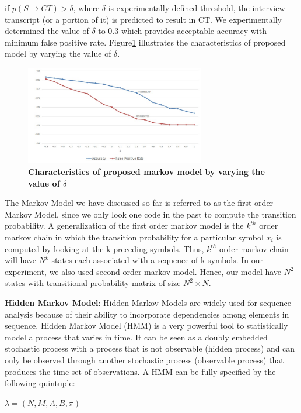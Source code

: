 \documentclass{amia}
\begin{document}
if $p(S\rightarrow CT) > \delta $, where $\delta$ is experimentally defined threshold, the interview transcript (or a portion of it) is predicted to result in CT. We experimentally determined the value of $\delta$ to 0.3 which provides acceptable accuracy with minimum false positive rate. Figure\ref{fig:delta} illustrates the characteristics of proposed model by varying the value of $\delta$. 

\begin{figure}[htb!]
    \centering
    \includegraphics[width=0.70\textwidth]{figures/deltadata.png}
    \caption{\textbf{Characteristics of proposed markov model by varying the value of $\delta$}}
    \label{fig:delta}
\end{figure}

The Markov Model we have discussed so far is referred to as the first order Markov Model, since we only look one code in the past to compute the transition probability. A generalization of the first order markov model is the $k^{th}$ order markov chain in which the transition probability for a particular symbol $x_i$ is computed by looking at the k preceding symbols. Thus, $k^{th}$ order markov chain will have $N^{k}$ states each associated with a sequence of k symbols. In our experiment, we also used second order markov model. Hence, our model have $N^2$ states with transitional probability matrix of size $N^2 \times N$.  

\textbf {Hidden Markov Model}: Hidden Markov Models are widely used for sequence analysis because of their ability to incorporate dependencies among elements in sequence. Hidden Markov Model (HMM) is a very
powerful tool to statistically model a process that varies in time. It can be seen as a doubly embedded stochastic process with a process that is not observable (hidden process) and can only be observed through another stochastic process (observable process) that produces the time set of observations. A HMM can be fully specified by the following quintuple:

\begin{center}
$\lambda = (N, M, A, B, \pi)$
\end{center}
\end{document}
